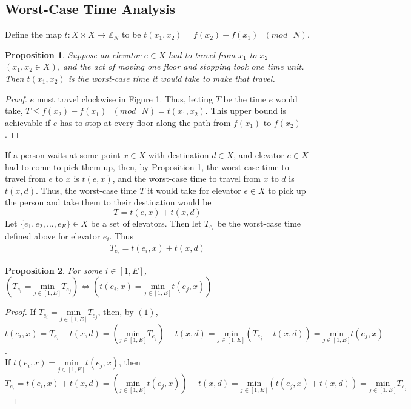 \documentclass[letterpaper]{article} %
\newtheorem{prop}{Proposition}
\begin{document}
\subsection{Worst-Case Time Analysis}
Define the map $t : X \times X \rightarrow \mathbb{Z}_N$ to be $t(x_1, x_2) = f(x_2) - f(x_1) \text{ } (mod \text{ } N)$. 

\begin{prop}
	Suppose an elevator $e \in X$ had to travel from $x_1$ to $x_2$ $(x_1, x_2 \in X)$, and the act of moving one floor and stopping took one time unit. Then $t(x_1, x_2)$ is the worst-case time it would take to make that travel. 
\end{prop}

\begin{proof}
	$e$ must travel clockwise in Figure 1. Thus, letting $T$ be the time $e$ would take, $T \leq f(x_2) - f(x_1) \text{ } (mod \text{ } N) = t(x_1, x_2)$. This upper bound is achievable if $e$ has to stop at every floor along the path from $f(x_1)$ to $f(x_2)$. 
\end{proof}

If a person waits at some point $x \in X$ with destination $d \in X$, and elevator $e \in X$ had to come to pick them up, then, by Proposition 1, the worst-case time to travel from $e$ to $x$ is $t(e, x)$, and the worst-case time to travel from $x$ to $d$ is $t(x, d)$.  Thus, the worst-case time $T$ it would take for elevator $e \in X$ to pick up the person and take them to their destination would be 
\[
	T = t(e, x) + t(x, d) 
\]
Let $\{e_1, e_2, ... , e_E\} \in X$ be a set of elevators. Then let $T_{e_i}$ be the worst-case time defined above for elevator $e_i$. Thus 
\begin{align}
	T_{e_i} = t(e_i, x) + t(x, d)
\end{align}

\begin{prop}
	For some $i \in [1, E]$, $\left(T_{e_i} = \underset{j \in [1, E]}{\mathrm{min}} T_{e_j}\right) \Leftrightarrow \left(t(e_i, x) = \underset{j \in [1, E]}{\mathrm{min}} t(e_j, x)\right)$
\end{prop}

\begin{proof}
	If $T_{e_i} = \underset{j \in [1, E]}{\mathrm{min}} T_{e_j}$, then, by $(1)$, $t(e_i, x) = T_{e_i} - t(x, d) = \left(\underset{j \in [1, E]}{\mathrm{min}} T_{e_j} \right) - t(x, d) = \underset{j \in [1, E]}{\mathrm{min}} \left(T_{e_j} - t(x, d)\right) = \underset{j \in [1, E]}{\mathrm{min}} t(e_j, x)$.\\
	If $t(e_i, x) = \underset{j \in [1, E]}{\mathrm{min}} t(e_j, x)$, then $T_{e_i} = t(e_i, x) + t(x, d) = \left(\underset{j \in [1, E]}{\mathrm{min}} t(e_j, x)\right) + t(x, d) = \underset{j \in [1, E]}{\mathrm{min}} (t(e_j, x) + t(x, d)) = \underset{j \in [1, E]}{\mathrm{min}} T_{e_j}$
\end{proof}
\end{document}
